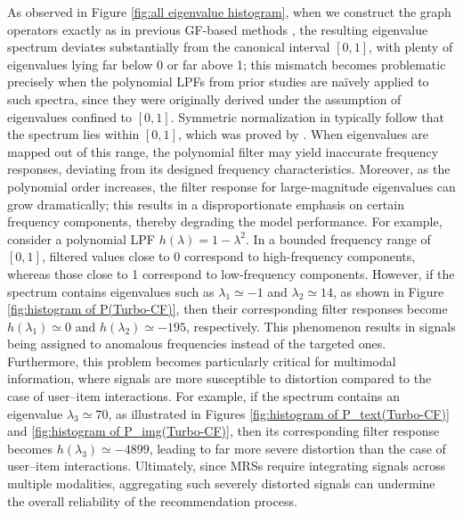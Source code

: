 \documentclass[a4paper,fleqn]{cas-sc}
\renewcommand{\cite}{\citep}
\begin{document}
As observed in Figure \ref{fig:all eigenvalue histogram}, when we construct the graph operators exactly as in previous GF-based methods \cite{DBLP:conf/sigir/ParkSS24, DBLP:conf/www/ParkYS25, DBLP:conf/www/KimCPS25}, the resulting eigenvalue spectrum deviates substantially from the canonical interval $[0, 1]$, with plenty of eigenvalues lying far below 0 or far above 1; this mismatch becomes problematic precisely when the polynomial LPFs from prior studies are na\"ively applied to such spectra, since they were originally derived under the assumption of eigenvalues confined to $[0, 1]$. Symmetric normalization in \cite{DBLP:conf/cikm/ShenWZSZLL21, DBLP:conf/www/LiuLGL0SG23, DBLP:conf/www/XiaLGLLG22} typically follow that the spectrum lies within $[0, 1]$, which was proved by \cite{DBLP:conf/cikm/ShenWZSZLL21}. When eigenvalues are mapped out of this range, the polynomial filter may yield inaccurate frequency responses, deviating from its designed frequency characteristics. Moreover, as the polynomial order increases, the filter response for large-magnitude eigenvalues can grow dramatically; this results in a disproportionate emphasis on certain frequency components, thereby degrading the model performance. For example, consider a polynomial LPF $h(\lambda) = 1 - \lambda^2$. In a bounded frequency range of $[0,1]$, filtered values close to 0 correspond to high-frequency components, whereas those close to 1 correspond to low-frequency components. However, if the spectrum contains eigenvalues such as $\lambda_1 \simeq -1$ and $\lambda_2 \simeq 14$, as shown in Figure \ref{fig:histogram of P(Turbo-CF)}, then their corresponding filter responses become $h(\lambda_1) \simeq 0$ and $h(\lambda_2) \simeq -195$, respectively. This phenomenon results in signals being assigned to anomalous frequencies instead of the targeted ones. Furthermore, this problem becomes particularly critical for multimodal information, where signals are more susceptible to distortion compared to the case of user--item interactions. For example, if the spectrum contains an eigenvalue $\lambda_3 \simeq 70$, as illustrated in Figures \ref{fig:histogram of P_text(Turbo-CF)} and \ref{fig:histogram of P_img(Turbo-CF)}, then its corresponding filter response becomes $h(\lambda_3) \simeq -4899$, leading to far more severe distortion than the case of user--item interactions. Ultimately, since MRSs require integrating signals across multiple modalities, aggregating such severely distorted signals can undermine the overall reliability of the recommendation process.
\end{document}
